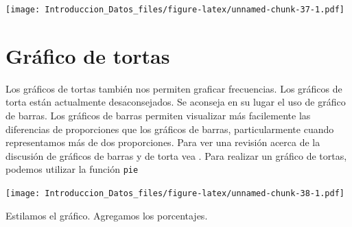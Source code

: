 \documentclass[spanish,]{book}
\newenvironment{Shaded}{\begin{snugshade}}{\end{snugshade}}
\newcommand{\KeywordTok}[1]{\textcolor[rgb]{0.13,0.29,0.53}{\textbf{#1}}}
\newcommand{\DataTypeTok}[1]{\textcolor[rgb]{0.13,0.29,0.53}{#1}}
\newcommand{\StringTok}[1]{\textcolor[rgb]{0.31,0.60,0.02}{#1}}
\newcommand{\OperatorTok}[1]{\textcolor[rgb]{0.81,0.36,0.00}{\textbf{#1}}}
\newcommand{\NormalTok}[1]{#1}
\begin{document}
\texttt{[image: Introduccion\_Datos\_files/figure-latex/unnamed-chunk-37-1.pdf]}

\section{Gráfico de tortas}\label{grafico-de-tortas}

Los gráficos de tortas también nos permiten graficar frecuencias. Los
gráficos de torta están actualmente desaconsejados. Se aconseja en su
lugar el uso de gráfico de barras. Los gráficos de barras permiten
visualizar más facilemente las diferencias de proporciones que los
gráficos de barras, particularmente cuando representamos más de dos
proporciones. Para ver una revisión acerca de la discusión de gráficos
de barras y de torta vea \citet{spence2005no}. Para realizar un gráfico
de tortas, podemos utilizar la función \texttt{pie}

\begin{Shaded}
\end{Shaded}

\texttt{[image: Introduccion\_Datos\_files/figure-latex/unnamed-chunk-38-1.pdf]}

Estilamos el gráfico. Agregamos los porcentajes.
\end{document}
